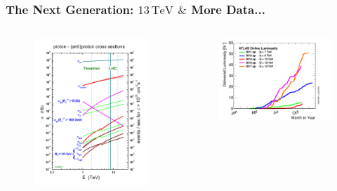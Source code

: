\documentclass[xcolor={usenames,dvipsnames,svgnames,table}]{beamer}
\begin{document}
\begin{frame}
	\frametitle{The Next Generation: $13\,\text{TeV}$ $\&$ More Data...}
	\begin{columns}
	\begin{column}{0.49\textwidth}
		\begin{figure}[t]
			\includegraphics[width=1.\textwidth]{plots/crosssections2013.jpg}
		\end{figure}
	\end{column}
	\begin{column}{0.49\textwidth}
		\begin{figure}[t]
			\includegraphics[width=1.\textwidth]{plots/intlumivsyear.png}

\end{figure}
\end{column}
\end{columns}
\end{frame}
\end{document}
